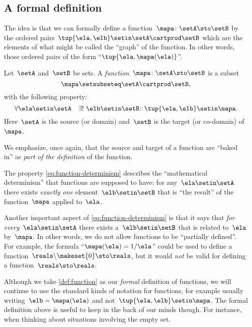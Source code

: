 \subsection{A formal definition}

The idea is that we can formally define a function~$\mapa\colon \setA \sto \setB$ by the ordered pairs~$\tup{\ela, \elb} \setin\setA \cartprod \setB$ which are the elements of what might be called the ``graph'' of the function.
In other words, those ordered pairs of the form ``$\tup{\ela, \mapa(\ela)}$''.

\begin{ctdefinition}[Function]
    \label{def:function}
    Let~$\setA$ and~$\setB$ be sets.
    A \emph{function}~$\mapa\colon \setA \sto \setB$ is a subset
    \begin{equation}
        \mapa \setsubseteq \setA \cartprod \setB,
    \end{equation}
    with the following property:
    \begin{equation}
        \label{eq:function-determinism}
        \forall \ela \setin\setA  \quad  \exists !
        \ \elb \setin\setB \colon \tup{\ela,\elb} \setin\mapa.
    \end{equation}
    Here~$\setA$ is the source (or domain) and~$\setB$ is the target (or co-domain) of~$\mapa$.
\end{ctdefinition}

We emphasize, once again, that the source and target of a function are ``baked in'' as \emph{part of the definition} of the function.

The property \cref{eq:function-determinism} describes the ``mathematical determinism'' that functions are supposed to have: for any~$\ela \setin\setA$ there exists \emph{exactly one} element~$\elb \setin\setB$ that is ``the result'' of the function~$\mapa$ applied to~$\ela$.

Another important aspect of \cref{eq:function-determinism} is that it says that \emph{for every}~$\ela \setin\setA$ there exists a~$\elb \setin\setB$ that is related to~$\ela$ by~$\mapa$.
In other words, we do not allow functions to be ``partially defined''.
For example, the formula ``$\mapa(\ela) = 1/ \ela$'' could be used to define a function~$\reals \backslash \makeset{ 0 } \sto \reals$, but it would \emph{not} be valid for defining a function~$\reals \sto \reals$.

Although we take \cref{def:function} as our \emph{formal} definition of functions, we will continue to use the standard kinds of notation for functions, for example usually writing~$\elb = \mapa(\ela)$ and not~$\tup{\ela, \elb} \setin\mapa$.
The formal definition above is useful to keep in the back of our minds though.
For instance, when thinking about situations involving the empty set.

